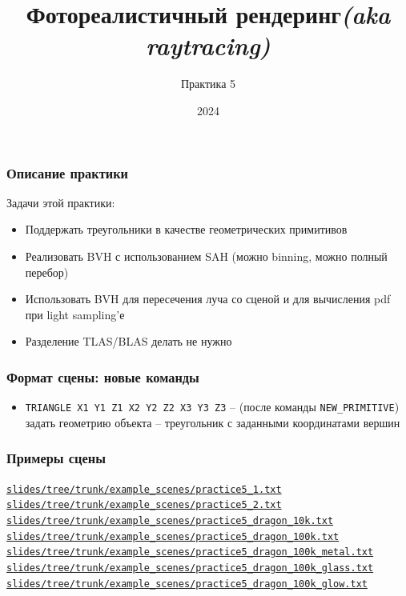 \documentclass[10pt,handout]{beamer}
\title{Фотореалистичный рендеринг\quad\quad\quad\quad\quad\quad \textit{(aka raytracing)}}
\subtitle{Практика 5}
\date{2024}
\begin{document}
\frame{\titlepage}

\begin{frame}[fragile]
\frametitle{Описание практики}
Задачи этой практики:
\begin{itemize}
\item Поддержать треугольники в качестве геометрических примитивов
\item Реализовать BVH с использованием SAH (можно binning, можно полный перебор)
\item Использовать BVH для пересечения луча со сценой и для вычисления pdf при light sampling'е
\item Разделение TLAS/BLAS делать не нужно
\end{itemize}
\end{frame}

\begin{frame}
\frametitle{Формат сцены: новые команды}
\begin{itemize}
\item \texttt{TRIANGLE X1 Y1 Z1 X2 Y2 Z2 X3 Y3 Z3} -- (после команды \texttt{NEW\_PRIMITIVE}) задать геометрию объекта -- треугольник с заданными координатами вершин
\end{itemize}
\end{frame}

\begin{frame}[fragile]
\frametitle{Примеры сцены}
\begin{scriptsize}
\href{https://github.com/lisyarus/raytracing-course-slides/tree/trunk/example_scenes/practice5_1.txt}{\texttt{slides/tree/trunk/example\_scenes/practice5\_1.txt}}
\href{https://github.com/lisyarus/raytracing-course-slides/tree/trunk/example_scenes/practice5_2.txt}{\texttt{slides/tree/trunk/example\_scenes/practice5\_2.txt}}
\href{https://github.com/lisyarus/raytracing-course-slides/tree/trunk/example_scenes/practice5_dragon_10k.txt}{\texttt{slides/tree/trunk/example\_scenes/practice5\_dragon\_10k.txt}}
\href{https://github.com/lisyarus/raytracing-course-slides/tree/trunk/example_scenes/practice5_dragon_100k.txt}{\texttt{slides/tree/trunk/example\_scenes/practice5\_dragon\_100k.txt}}
\href{https://github.com/lisyarus/raytracing-course-slides/tree/trunk/example_scenes/practice5_dragon_100k_metal.txt}{\texttt{slides/tree/trunk/example\_scenes/practice5\_dragon\_100k\_metal.txt}}
\href{https://github.com/lisyarus/raytracing-course-slides/tree/trunk/example_scenes/practice5_dragon_100k_glass.txt}{\texttt{slides/tree/trunk/example\_scenes/practice5\_dragon\_100k\_glass.txt}}
\href{https://github.com/lisyarus/raytracing-course-slides/tree/trunk/example_scenes/practice5_dragon_100k_glow.txt}{\texttt{slides/tree/trunk/example\_scenes/practice5\_dragon\_100k\_glow.txt}}
\end{scriptsize}
\end{frame}
\end{document}
